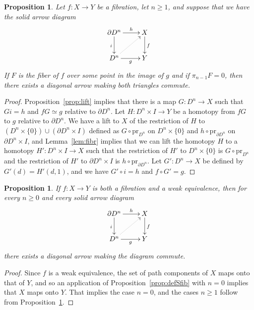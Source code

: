 \documentclass{amsart}
\numberwithin{equation}{section}
\theoremstyle{slplain}
\newtheorem{prop}[equation]{Proposition}
\theoremstyle{definition}
\theoremstyle{remark}
\newcommand{\propref}{Proposition~\ref}
\newcommand{\lemref}{Lemma~\ref}
\newcommand{\pr}{\mathrm{pr}}
\newcommand{\bdry}{\partial}
\newcommand{\homotopic}{\simeq}
\begin{document}
\begin{prop}
  \label{prop:liftcell}
  Let $f\colon X \to Y$ be a fibration, let $n \ge 1$, and suppose
  that we have the solid arrow diagram
  \begin{displaymath}
    \xymatrix{
      {\partial D^{n}} \ar[r]^-{h} \ar[d]_{i}
      & {X} \ar[d]^{f}\\
      {D^{n}} \ar[r]_-{g} \ar@{..>}[ur]
      & {Y}
    }
  \end{displaymath}
  If $F$ is the fiber of $f$ over some point in the image of $g$ and
  if $\pi_{n-1}F = 0$, then there exists a diagonal arrow making both
  triangles commute.
\end{prop}

\begin{proof}
  \propref{prop:lift} implies that there is a map $G\colon D^{n} \to
  X$ such that $Gi = h$ and $fG \homotopic g$ relative to $\bdry
  D^{n}$.  Let $H\colon D^{n}\times I \to Y$ be a homotopy from $fG$
  to $g$ relative to $\partial D^{n}$.  We have a lift to $X$ of the
  restriction of $H$ to $(D^{n}\times\{0\}) \cup (\partial D^{n}\times
  I)$ defined as $G \circ \pr_{D^{n}}$ on $D^{n}\times \{0\}$ and $h
  \circ \pr_{\partial D^{n}}$ on $\partial D^{n}\times I$, and
  \lemref{lem:fibr} implies that we can lift the homotopy $H$ to a
  homotopy $H'\colon D^{n}\times I \to X$ such that the restriction of
  $H'$ to $D^{n}\times\{0\}$ is $G \circ \pr_{D^{n}}$ and the
  restriction of $H'$ to $\partial D^{n}\times I$ is $h \circ
  \pr_{\partial D^{n}}$.  Let $G'\colon D^{n} \to X$ be defined by
  $G'(d) = H'(d,1)$, and we have $G' \circ i = h$ and $f\circ G' = g$.
\end{proof}


\begin{prop}
  \label{prop:liftcellwe}
  If $f\colon X \to Y$ is both a fibration and a weak equivalence,
  then for every $n \ge 0$ and every solid arrow diagram
  \begin{equation}
    \label{diag:liftcellwe}
    \vcenter{
      \xymatrix{
        {\partial D^{n}} \ar[r]^-{h} \ar[d]_{i}
        & {X} \ar[d]^{f}\\
        {D^{n}} \ar[r]_-{g} \ar@{..>}[ur]
        & {Y}
      }%
    }%
  \end{equation}
  there exists a diagonal arrow making the diagram commute.
\end{prop}

\begin{proof}
  Since $f$ is a weak equivalence, the set of path components of $X$
  maps onto that of $Y$, and so an application of
  \propref{prop:defSfib} with $n = 0$ implies that $X$ maps onto $Y$.
  That implies the case $n = 0$, and the cases $n \ge 1$ follow from
  \propref{prop:liftcell}.
\end{proof}
\end{document}
